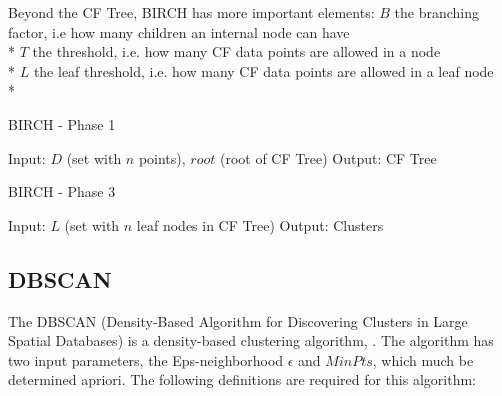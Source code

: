 \documentclass[conference, 10pt]{IEEEtran}
\begin{document}
Beyond the CF Tree, BIRCH has more important elements:\vspace{1 mm}
$B$ the branching factor, i.e how many children an internal node can have\\*
$T$ the threshold, i.e. how many CF data points are allowed in a node\\*
$L$ the leaf threshold, i.e. how many CF data points are allowed in a leaf node\\*

\begin{algorithm}
\caption{BIRCH - Phase 1}
\begin{algorithmic}[1]
    \State Input: $D$ (set with $n$ points), $root$ (root of CF Tree)
    \State Output: CF Tree
        \Else
      \EndIf
    \EndFor
  \EndProcedure
\end{algorithmic}
\end{algorithm}

\begin{algorithm}
\caption{BIRCH - Phase 3}
\begin{algorithmic}[1]
    \State Input: $L$ (set with $n$ leaf nodes in CF Tree)
    \State Output: Clusters
          \EndIf
        \EndFor
      \EndFor
    \EndWhile
  \EndProcedure
\end{algorithmic}
\end{algorithm}

\subsection{DBSCAN}
The DBSCAN (Density-Based Algorithm for Discovering Clusters in Large Spatial Databases) is a density-based clustering algorithm, . The algorithm has two input parameters, the Eps-neighborhood $\epsilon$ and $MinPts$, which much be determined apriori. The following definitions are required for this algorithm:
\end{document}
